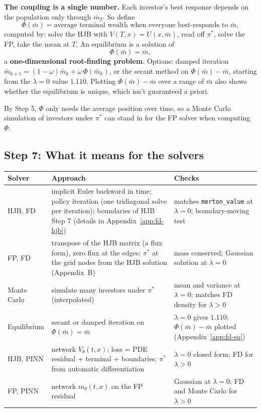 \documentclass[11pt]{article}
\newcommand{\mb}{\bar m}
\begin{document}
\textbf{The coupling is a single number.} Each investor's best response depends on the
population only through $\mb_T$. So define
\[
  \Phi(\mb) = \text{average terminal wealth when everyone best-responds to }\mb ,
\]
computed by: solve the HJB with $V(T,x)=U(x,\mb)$, read off $\pi^*$, solve the FP, take the
mean at $T$. An equilibrium is a solution of
\[
  \Phi(\mb) = \mb ,
\]
a \textbf{one-dimensional root-finding problem}. Options: damped iteration
$\mb_{k+1}=(1-\omega)\mb_k+\omega\,\Phi(\mb_k)$, or the secant method on $\Phi(\mb)-\mb$,
starting from the $\lambda=0$ value $1.110$. Plotting $\Phi(\mb)-\mb$ over a range of $\mb$
also shows whether the equilibrium is unique, which isn't guaranteed a priori.

By Step 5, $\Phi$ only needs the average position over time, so a Monte Carlo simulation of
investors under $\pi^*$ can stand in for the FP solver when computing $\Phi$.

\subsection*{Step 7: What it means for the solvers}
\begin{center}
\small
\begin{tabular}{@{}p{}p{}p{}@{}}
\toprule
Solver & Approach & Checks \\
\midrule
HJB, FD & implicit Euler backward in time; policy iteration (one tridiagonal solve per
iteration); boundaries of HJB Step 7 (details in Appendix~\ref{app:fd-hjb})
& matches \texttt{merton\_value} at $\lambda=0$; boundary-moving test \\
FP, FD & transpose of the HJB matrix (a flux form), zero flux at the edges; $\pi^*$ at
the grid nodes from the HJB solution (Appendix~B)
& mass conserved; Gaussian solution at $\lambda=0$ \\
Monte Carlo & simulate many investors under $\pi^*$ (interpolated)
& mean and variance at $\lambda=0$; matches FD density for $\lambda>0$ \\
Equilibrium & secant or damped iteration on $\Phi(\mb)=\mb$
& $\lambda=0$ gives $1.110$; $\Phi(\mb)-\mb$ plotted (Appendix~\ref{app:fd-eq}) \\
HJB, PINN & network $V_\theta(t,x)$; loss = PDE residual + terminal + boundaries;
$\pi^*$ from automatic differentiation
& $\lambda=0$ closed form; FD for $\lambda>0$ \\
FP, PINN & network $m_\theta(t,x)$ on the FP residual
& Gaussian at $\lambda=0$; FD and Monte Carlo for $\lambda>0$ \\
\bottomrule
\end{tabular}
\end{center}
\end{document}
